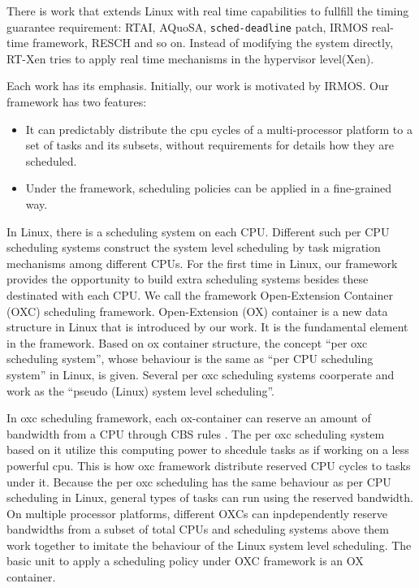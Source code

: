 There is work that extends Linux with real time capabilities to fullfill 
the timing guarantee requirement: RTAI\cite{rtai}, AQuoSA\cite{Luigi09}, 
\texttt{sched-deadline} patch\cite{Dario09}, 
IRMOS real-time framework, RESCH and so on.
Instead of modifying the system directly, RT-Xen tries to apply real 
time mechanisms in the hypervisor level(Xen). 

Each work has its emphasis. Initially, our work is motivated by
IRMOS. 
Our framework has two features:
\begin{itemize}
\item It can predictably distribute the cpu cycles of a
  multi-processor platform to a set of tasks and its subsets, without
  requirements for details how they are scheduled.
\item Under the framework, scheduling policies can be applied in a
  fine-grained way.
\end{itemize}


In Linux, there is a scheduling system on each CPU. Different such per
CPU scheduling systems construct the system level scheduling by task
migration mechanisms among different CPUs. For the first time in
Linux, our framework provides the opportunity to build extra
scheduling systems besides these destinated with each CPU. We call the
framework Open-Extension Container (OXC) scheduling
framework. Open-Extension (OX) container is a new data structure in
Linux that is introduced by our work.  It is the fundamental element
in the framework. Based on ox container structure, the concept ``per
oxc scheduling system'', whose behaviour is the same as ``per CPU
scheduling system'' in Linux, is given. Several per oxc scheduling
systems coorperate and work as the ``pseudo (Linux) system level
scheduling''.

In oxc scheduling framework, each ox-container can reserve an amount
of bandwidth from a CPU through CBS rules \cite{AbeniB98}. The per oxc
scheduling system based on it utilize this computing power to shcedule
tasks as if working on a less powerful cpu. This is how oxc framework
distribute reserved CPU cycles to tasks under it. Because the per oxc
scheduling has the same behaviour as per CPU scheduling in Linux,
general types of tasks can run using the reserved bandwidth. On
multiple processor platforms, different OXCs can inpdependently
reserve bandwidths from a subset of total CPUs and scheduling systems
above them work together to imitate the behaviour of the Linux system
level scheduling. The basic unit to apply a scheduling policy under
OXC framework is an OX container.
